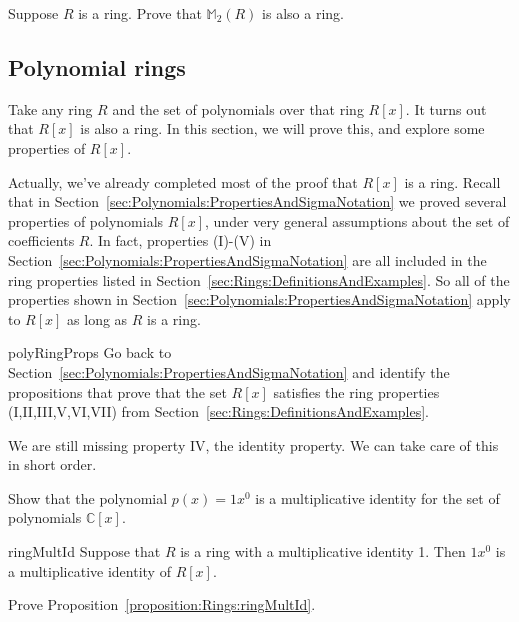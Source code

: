 \begin{exercise}{}
Suppose $R$ is a ring. Prove that  ${\mathbb M}_2(R)$ is also a ring.
\end{exercise}


\subsection{Polynomial rings}
\label{subsec:Rings:DefinitionsAndExamples:polynomialRings}

Take any ring $R$ and the set of polynomials over that ring $R[x]$.  It turns out that $R[x]$ is also a ring.  In this section, we will prove this, and explore some properties of $R[x]$. 

Actually, we've already completed most of the proof that $R[x]$ is a ring. Recall that in Section~\ref{sec:Polynomials:PropertiesAndSigmaNotation} we proved several properties of polynomials $R[x]$, under very general assumptions about the set of coefficients $R$.  In fact, properties (I)-(V) in Section~\ref{sec:Polynomials:PropertiesAndSigmaNotation} are all included in the ring properties listed in Section~\ref{sec:Rings:DefinitionsAndExamples}. So all of the properties shown in Section~\ref{sec:Polynomials:PropertiesAndSigmaNotation} apply to $R[x]$ as long as $R$ is a ring.

\begin{exercise}{polyRingProps}
Go back to Section~\ref{sec:Polynomials:PropertiesAndSigmaNotation} and identify the propositions that prove that the set $R[x]$ satisfies the ring properties (I,II,III,V,VI,VII) from Section~\ref{sec:Rings:DefinitionsAndExamples}.
\end{exercise}

We are still missing property IV, the identity property. We can take care of this in short order.

\begin{exercise}{}
Show that the polynomial $p(x) = 1x^0$ is a multiplicative identity for the set of polynomials $\mathbb{C}[x]$.
\end{exercise}

\begin{prop}{ringMultId}
Suppose that $R$ is a ring with a multiplicative identity 1. Then $1x^0$ is a multiplicative identity of $R[x]$.
\end{prop}

\begin{exercise}{}
Prove Proposition~\ref{proposition:Rings:ringMultId}.
\end{exercise}

